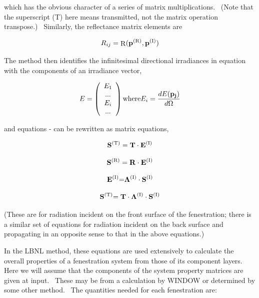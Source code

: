 which has the obvious character of a series of matrix multiplications.~ (Note that the superscript (T) here means transmitted, not the matrix operation transpose.)~ Similarly, the reflectance matrix elements are

\begin{equation}
{R_{ij}} = {\mathop{\rm R}\nolimits} ({{\bf{p}}^{{\rm{(R)}}}},{{\bf{p}}^{{\rm{(I)}}}})
\end{equation}

The method then identifies the infinitesimal directional irradiances in equation with the components of an irradiance vector,

\begin{equation}
E = \left( 
    \begin{array}{c}
      E_1 \\ ... \\ E_i \\ ...
    \end{array}
  \right)
  \text{where}
  E_i = \frac{dE(\bf{p}_j)}{d\Omega}
\end{equation}

and equations - can be rewritten as matrix equations,

\begin{equation}
{{\bf{S}}^{{\rm{(T)}}}} = {\bf{T}} \cdot {{\bf{E}}^{{\rm{(I)}}}}
\end{equation}

\begin{equation}
{{\bf{S}}^{{\rm{(R)}}}} = {\bf{R}} \cdot {{\bf{E}}^{{\rm{(I)}}}}
\end{equation}

\begin{equation}
{{\bf{E}}^{{\rm{(I)}}}}{\bf{ = }}{\bf{\Lambda }^{{\rm{(I)}}}} \cdot {{\bf{S}}^{{\rm{(I)}}}}
\end{equation}

\begin{equation}
{{\bf{S}}^{{\rm{(T)}}}}{\bf{ = T}} \cdot {\bf{\Lambda }^{{\rm{(I)}}}} \cdot {{\bf{S}}^{{\rm{(I)}}}}
\end{equation}

(These are for radiation incident on the front surface of the fenestration; there is a similar set of equations for radiation incident on the back surface and propagating in an opposite sense to that in the above equations.)

In the LBNL method, these equations are used extensively to calculate the overall properties of a fenestration system from those of its component layers.~ Here we will assume that the components of the system property matrices are given at input.~ These may be from a calculation by WINDOW or determined by some other method.~ The quantities needed for each fenestration are:

